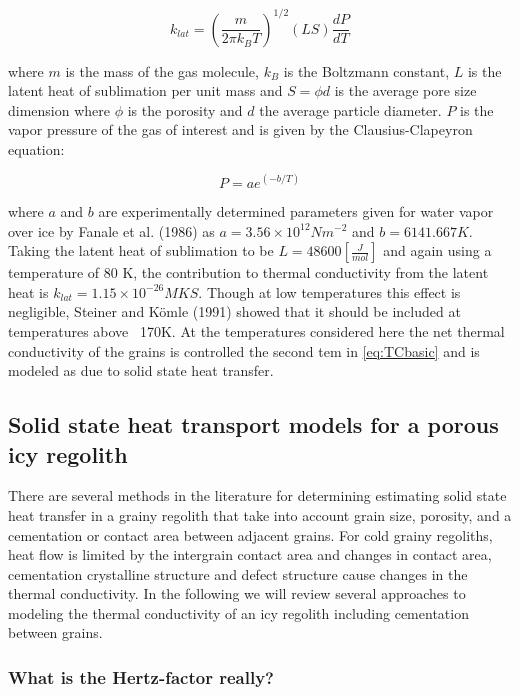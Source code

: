 \documentclass[11pt]{article} %
\begin{document}
\begin{itemize}
	\begin{equation}
	k_{lat} = ( \frac{m}{2 \pi k_{B} T})^{1/2}  (L S) \frac{dP}{dT}
	\end{equation}
	
	where $m$ is the mass of the gas molecule, $k_{B}$ is the Boltzmann constant, $L$ is the latent heat of sublimation per unit mass and $S = \phi d$ is the average pore size dimension where $\phi$ is the porosity and $d$ the average particle diameter. $P$ is the vapor pressure of the gas of interest and is given by the Clausius-Clapeyron equation:
	 
	 \begin{equation} \label{eqn:CCpres}
	 P = ae^{(-b/T)}
	 \end{equation}
	 
	 where $a$ and $b$ are experimentally determined parameters given for water vapor over ice by Fanale et al. (1986) as $a = 3.56 \times 10^{12} N m^{-2}$ and $b = 6141.667 K$. Taking the latent heat of sublimation to be $L = 48600 [\frac{J}{mol}]$ and again using a temperature of 80 K, the contribution to thermal conductivity from the latent heat is $k_{lat} = 1.15\times10^{-26} MKS$. Though at low temperatures this effect is negligible, Steiner and K\"{o}mle (1991) showed that it should be included at temperatures above ~170K. At the temperatures considered here the net thermal conductivity of the grains is controlled the second tem in \ref{eq:TCbasic} and is modeled as due to solid state heat transfer.

\subsection{Solid state heat transport models for a porous icy regolith}
	There are several methods in the literature for determining estimating solid state heat transfer in a grainy regolith that take into account grain size, porosity, and a cementation or contact area between adjacent grains. For cold grainy regoliths, heat flow is limited by the intergrain contact area and changes in contact area, cementation crystalline structure and defect structure  cause changes in the thermal conductivity. In the following we will review several approaches to modeling the thermal conductivity of an icy regolith including cementation between grains. 

\subsubsection{What is the Hertz-factor really?}


\end{itemize}
\end{document}
